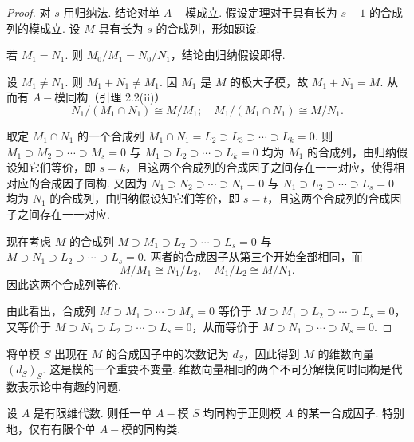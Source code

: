 \begin{proof}
对 $s$ 用归纳法. 结论对单 $A-\!\!$模成立. 假设定理对于具有长为 $s-1$ 的合成列的模成立. 设 $M$ 具有长为 $s$ 的合成列，形如题设.

若 $M_1 = N_1$. 则 $M_0/M_1 = N_0/N_1$，结论由归纳假设即得.

设 $M_1 \neq N_1$. 则 $M_1 + N_1 \neq M_1$. 因 $M_1$ 是 $M$ 的极大子模，故 $M_1 + N_1 = M$.
从而有 $A-\!\!$模同构（引理 2.2(ii)）
\[ N_1/(M_1 \cap N_1) \cong M/M_1; \quad M_1/(M_1 \cap N_1) \cong M/N_1. \]

取定 $M_1 \cap N_1$ 的一个合成列 $M_1 \cap N_1 = L_2 \supset L_3 \supset \cdots \supset L_k = 0$. 则
$M_1 \supset M_2 \supset \cdots \supset M_s = 0$ 与 $M_1 \supset L_2 \supset \cdots \supset L_k = 0$ 均为 $M_1$ 的合成列，由归纳假设知它们等价，即 $s = k$，且这两个合成列的合成因子之间存在一一对应，使得相对应的合成因子同构. 又因为 $N_1 \supset N_2 \supset \cdots \supset N_t = 0$ 与 $N_1 \supset L_2 \supset \cdots \supset L_s = 0$ 均为 $N_1$ 的合成列，由归纳假设知它们等价，即 $s = t$，且这两个合成列的合成因子之间存在一一对应.

现在考虑 $M$ 的合成列 $M \supset M_1 \supset L_2 \supset \cdots \supset L_s = 0$ 与 $M \supset N_1 \supset L_2 \supset \cdots \supset L_s = 0$. 两者的合成因子从第三个开始全部相同，而
\[ M/M_1 \cong N_1/L_2, \quad M_1/L_2 \cong M/N_1. \]
因此这两个合成列等价.

由此看出，合成列 $M \supset M_1 \supset \cdots \supset M_s = 0$ 等价于 $M \supset M_1 \supset L_2 \supset \cdots \supset L_s = 0$，又等价于 $M \supset N_1 \supset L_2 \supset \cdots \supset L_s = 0$，从而等价于 $M \supset N_1 \supset \cdots \supset N_s = 0$.
\end{proof}
\begin{remark}
    将单模 $S$ 出现在 $M$ 的合成因子中的次数记为 $d_S$，因此得到 $M$ 的维数向量 $(d_S)_S$. 这是模的一个重要不变量. 维数向量相同的两个不可分解模何时同构是代数表示论中有趣的问题.
\end{remark}

\begin{theorem}[]
设 $A$ 是有限维代数. 则任一单 $A-\!\!$模 $S$ 均同构于正则模 $A$ 的某一合成因子. 特别地，仅有有限个单 $A-\!\!$模的同构类.
\end{theorem}

